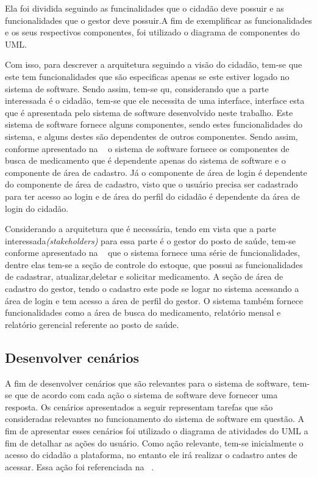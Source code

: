 %

Ela foi dividida seguindo as funcinalidades que o cidadão deve possuir e as funcionalidades que o gestor deve possuir.A fim de exemplificar as funcionalidades e os seus respectivos componentes, foi utilizado o diagrama de componentes do \acrfull{UML}.

Com isso, para descrever a arquitetura seguindo a visão do cidadão, tem-se que este tem funcionalidades que são especificas apenas se este estiver logado no sistema de software. Sendo assim, tem-se qu, considerando que a parte interessada é o cidadão, tem-se que ele necessita de uma interface, interface esta que é apresentada pelo sistema de software desenvolvido neste trabalho. Este sistema de software fornece alguns componentes, sendo estes funcionalidades do sistema, e alguns destes são dependentes de outros componentes. Sendo assim, conforme apresentado na ~ o sistema de software fornece os componentes de busca de medicamento que é dependente apenas do sistema de software e o componente de área de cadastro. Já o componente de área de login é dependente do componente de área de cadastro, visto que o usuário precisa ser cadastrado para ter acesso ao login e de área do perfil do cidadão é dependente da área de login do cidadão.


%

Considerando a arquitetura que é necessária, tendo em vista que a parte interessada\emph{(stakeholders)} para essa parte é o gestor do posto de saúde, tem-se conforme apresentado na ~ que o sistema fornece uma série de funcionalidades, dentre elas tem-se a seção de controle do estoque, que possui as funcionalidades de cadastrar, atualizar,deletar e solicitar medicamento. A seção de área de cadastro do gestor, tendo o cadastro este pode se logar no sistema acessando a área de login e tem acesso a área de perfil do gestor. O sistema também fornece funcionalidades como a área de busca do medicamento, relatório mensal e relatório gerencial referente ao posto de saúde.

\subsection{Desenvolver cenários}

A fim de desenvolver cenários que são relevantes para o sistema de software, tem-se que de acordo com cada ação o sistema de software deve fornecer uma resposta.
Os cenários apresentados a seguir representam tarefas que são consideradas relevantes no funcionamento do sistema de software em questão. A fim de apresentar esses cenários foi utilizado o diagrama de atividades do \acrfull{UML} a fim de detalhar as ações do usuário. Como ação relevante, tem-se inicialmente o acesso do cidadão a plataforma, no entanto ele irá realizar o cadastro antes de acessar. Essa ação foi referenciada na ~.

